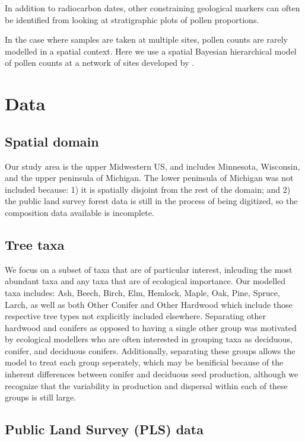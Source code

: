 \documentclass[12pt]{article}
\begin{document}
In addition to radiocarbon dates, other constraining geological
markers can often be identified from looking at stratigraphic plots of
pollen proportions.


In the case where samples are taken at multiple sites, pollen counts
are rarely modelled in a spatial context. Here we use a spatial
Bayesian hierarchical model of pollen counts at a network of sites
developed by \cite{XXX}.


\section{Data}

\subsection{Spatial domain}
Our study area is the upper Midwestern US, and includes Minnesota,
Wisconsin, and the upper peninsula of Michigan. The lower peninsula of
Michigan was not included because: 1) it is spatially disjoint from
the rest of the domain; and 2) the public land survey forest data is
still in the process of being digitized, so the composition data
available is incomplete.

\subsection{Tree taxa}
We focus on a subset of taxa that are of particular interest,
inlcuding the most abundant taxa and any taxa that are of ecological
importance. Our modelled taxa includes: Ash, Beech, Birch, Elm,
Hemlock, Maple, Oak, Pine, Spruce, Larch, as well as both Other
Conifer and Other Hardwood which include those respective tree types
not explicitly included elsewhere. Separating other hardwood and
conifers as opposed to having a single other group was motivated by
ecological modellers who are often interested in grouping taxa as
deciduous, conifer, and deciduous conifers. Additionally, separating
these groups allows the model to treat each group seperately, which
may be benificial because of the inherent differences between conifer
and deciduous seed production, although we recognize that the
variability in production and dispersal within each of these groups is
still large.

\subsection{Public Land Survey (PLS) data}
\end{document}
